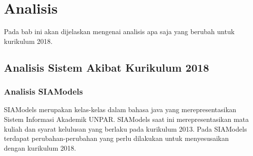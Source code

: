 \chapter{Analisis}
\label{chap:analisis}

Pada bab ini akan dijelaskan mengenai analisis apa saja yang berubah untuk kurikulum 2018.

\section{Analisis Sistem Akibat Kurikulum 2018}

\subsection{Analisis SIAModels }
\label{subbab:analisissiamodels}

SIAModels merupakan kelas-kelas dalam bahasa java yang merepresentasikan Sistem Informasi Akademik UNPAR. SIAModels saat ini merepresentasikan mata kuliah dan syarat kelulusan yang berlaku pada kurikulum 2013. Pada SIAModels terdapat perubahan-perubahan yang perlu dilakukan untuk menyesusaikan dengan kurikulum 2018.

